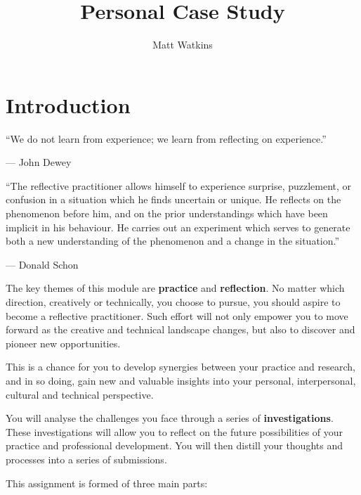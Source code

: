\documentclass{../../fal_assignment_opendyslexic}
\title{Personal Case Study}
\author{Matt Watkins}
\begin{document}
\maketitle

\section*{Introduction}

\begin{marginquote}
“We do not learn from experience; we learn from reflecting on experience.”

— John Dewey

“The reflective practitioner allows himself to experience surprise, puzzlement, or confusion in a situation which he finds uncertain or unique. He reflects on the phenomenon before him, and on the prior understandings which have been implicit in his behaviour. He carries out an experiment which serves to generate both a new understanding of the phenomenon and a change in the situation.”

— Donald Schon
\end{marginquote}

The key themes of this module are \textbf{practice} and \textbf{reflection}. No matter which direction, creatively or technically, you choose to pursue, you should aspire to become a reflective practitioner. Such effort will not only empower you to move forward as the creative and technical landscape changes, but also to discover and pioneer new opportunities.

This is a chance for you to develop synergies between your practice and research, and in so doing, gain new and valuable insights into your personal, interpersonal, cultural and technical perspective.

You will analyse the challenges you face through a series of \textbf{investigations}. These investigations will allow you to reflect on the future possibilities of your practice and professional development. You will then distill your thoughts and processes into a series of submissions.

This assignment is formed of three main parts:
\end{document}
